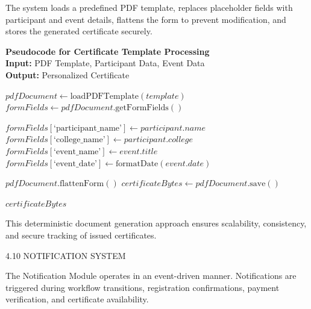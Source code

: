 The system loads a predefined PDF template, replaces placeholder fields with participant and event details, flattens the form to prevent modification, and stores the generated certificate securely.

\noindent\textbf{Pseudocode for Certificate Template Processing} 
\vspace{.2em} \\
\noindent\textbf{Input:} PDF Template, Participant Data, Event Data\\
\noindent\textbf{Output:} Personalized Certificate
\begin{algorithmic}[1]
    \State $pdfDocument \gets \text{loadPDFTemplate}(template)$
    \State $formFields \gets pdfDocument.\text{getFormFields}()$
    
    \State $formFields[\text{`participant\_name'}] \gets participant.name$
    \State $formFields[\text{`college\_name'}] \gets participant.college$
    \State $formFields[\text{`event\_name'}] \gets event.title$
    \State $formFields[\text{`event\_date'}] \gets \text{formatDate}(event.date)$
    
    \State $pdfDocument.\text{flattenForm}()$
    \State $certificateBytes \gets pdfDocument.\text{save}()$
    
    \State \Return $certificateBytes$
\EndFunction
\end{algorithmic}

This deterministic document generation approach ensures scalability, consistency, and secure tracking of issued certificates.

4.10 NOTIFICATION SYSTEM

The Notification Module operates in an event-driven manner. Notifications are triggered during workflow transitions, registration confirmations, payment verification, and certificate availability.

